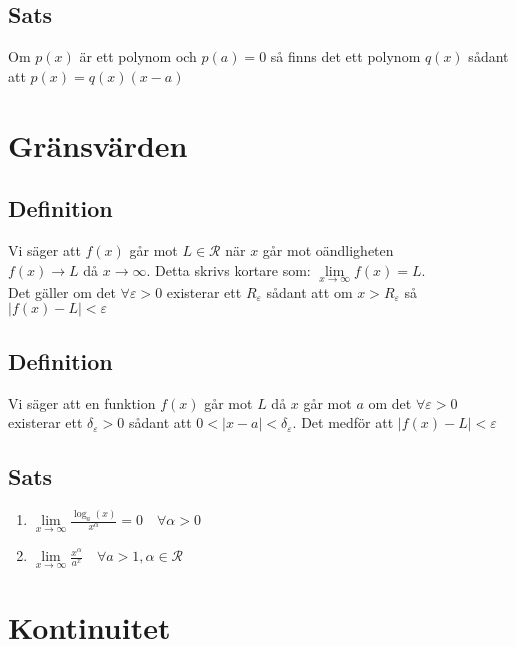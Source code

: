 \documentclass{article}
\begin{document}
\subsection{Sats}
Om $p(x)$ är ett polynom och $p(a)=0$ så finns det ett polynom $q(x)$ sådant att $p(x)=q(x)(x-a)$

\section{Gränsvärden}
\subsection{Definition}
Vi säger att $f(x)$ går mot $L\in \mathcal{R}$ när $x$ går mot oändligheten\\
$f(x) \to L$ då $x \rightarrow \infty$. Detta skrivs kortare som: $\lim\limits_{x \to\infty} f(x)=L$.\\
Det gäller om det $\forall\varepsilon>0$ existerar ett $R_{\varepsilon}$ sådant att om $x>R_{\varepsilon}$ så $|f(x)-L|<\varepsilon$

\subsection{Definition}
Vi säger att en funktion $f(x)$ går mot $L$ då $x$ går mot $a$ om det $\forall\varepsilon>0$ existerar ett $\delta_{\varepsilon}>0$ sådant att $0<|x-a|<\delta_{\varepsilon}$. Det medför att $|f(x)-L|<\varepsilon$


\subsection{Sats}
\begin{enumerate}
   \item $\lim\limits_{x\to\infty}\frac{\log_a(x)}{x^\alpha}=0 \quad \forall\alpha > 0$
   \item $\lim\limits_{x\to\infty}\frac{x^\alpha}{a^x}\quad \forall a>1,\alpha \in \mathcal{R}$
\end{enumerate}

\section{Kontinuitet}
\end{document}
